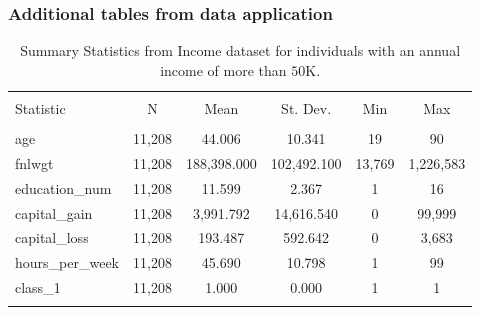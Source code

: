 \subsubsection{Additional tables from data application}
\label{app:data-tables}

\begin{table}[H] \centering 
\begin{tabular}{@{\extracolsep{5pt}}lccccc} 
\\[-1.8ex]\hline 
\hline \\[-1.8ex] 
Statistic & \multicolumn{1}{c}{N} & \multicolumn{1}{c}{Mean} & \multicolumn{1}{c}{St. Dev.} & \multicolumn{1}{c}{Min} & \multicolumn{1}{c}{Max} \\ 
\hline \\[-1.8ex] 
age & 11,208 & 44.006 & 10.341 & 19 & 90 \\ 
fnlwgt & 11,208 & 188,398.000 & 102,492.100 & 13,769 & 1,226,583 \\ 
education\_num & 11,208 & 11.599 & 2.367 & 1 & 16 \\ 
capital\_gain & 11,208 & 3,991.792 & 14,616.540 & 0 & 99,999 \\ 
capital\_loss & 11,208 & 193.487 & 592.642 & 0 & 3,683 \\ 
hours\_per\_week & 11,208 & 45.690 & 10.798 & 1 & 99 \\ 
class\_1 & 11,208 & 1.000 & 0.000 & 1 & 1 \\ 
\hline \\[-1.8ex] 
\end{tabular} 
\caption[Data application - Summary statistics for individuals with an annual income of more than $50$K]{Summary Statistics from Income dataset for individuals with an annual income of more than $50$K.} 
\label{tab:data-summary2} 
\end{table}

